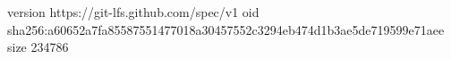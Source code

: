 version https://git-lfs.github.com/spec/v1
oid sha256:a60652a7fa85587551477018a30457552c3294eb474d1b3ae5de719599e71aee
size 234786
